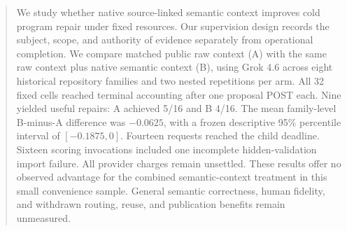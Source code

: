 \begin{abstract}
We study whether native source-linked semantic context improves cold program
repair under fixed resources. Our supervision design records the subject,
scope, and authority of evidence separately from operational completion.
We compare matched public raw context (A) with the same raw context plus native
semantic context (B), using Grok 4.6 across eight historical repository families
and two nested repetitions per arm. All 32 fixed cells reached terminal
accounting after one proposal POST each. Nine yielded useful repairs: A achieved
5/16 and B 4/16. The mean family-level B-minus-A difference was $-0.0625$, with
a frozen descriptive 95\% percentile interval of $[-0.1875,0]$.
Fourteen requests reached the child deadline. Sixteen scoring invocations
included one incomplete hidden-validation import failure. All provider charges
remain unsettled. These results offer no observed advantage for the combined
semantic-context treatment in this small convenience sample. General semantic
correctness, human fidelity, and withdrawn routing, reuse, and publication
benefits remain unmeasured.
\end{abstract}

